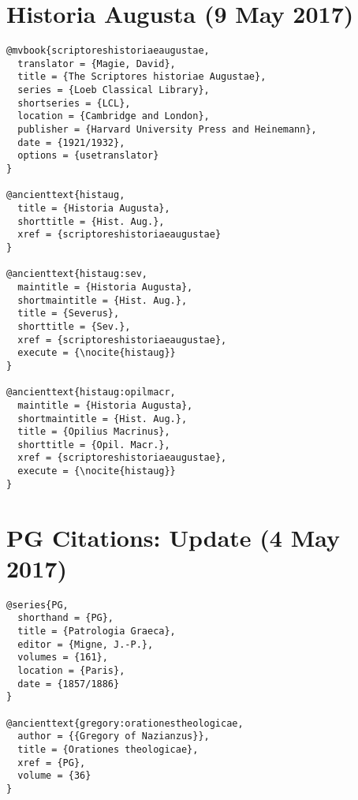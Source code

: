 \documentclass[a4paper]{article}
\begin{document}
\nocite{musoniusrufusfrag:abbrev}
\exampleancientsources
\examplesecondarysources
\examplebibliography
{}

\section{Historia Augusta (9 May 2017)}

\begin{verbatim}
@mvbook{scriptoreshistoriaeaugustae,
  translator = {Magie, David},
  title = {The Scriptores historiae Augustae},
  series = {Loeb Classical Library},
  shortseries = {LCL},
  location = {Cambridge and London},
  publisher = {Harvard University Press and Heinemann},
  date = {1921/1932},
  options = {usetranslator}
}

@ancienttext{histaug,
  title = {Historia Augusta},
  shorttitle = {Hist. Aug.},
  xref = {scriptoreshistoriaeaugustae}
}

@ancienttext{histaug:sev,
  maintitle = {Historia Augusta},
  shortmaintitle = {Hist. Aug.},
  title = {Severus},
  shorttitle = {Sev.},
  xref = {scriptoreshistoriaeaugustae},
  execute = {\nocite{histaug}}
}

@ancienttext{histaug:opilmacr,
  maintitle = {Historia Augusta},
  shortmaintitle = {Hist. Aug.},
  title = {Opilius Macrinus},
  shorttitle = {Opil. Macr.},
  xref = {scriptoreshistoriaeaugustae},
  execute = {\nocite{histaug}}
}
\end{verbatim}

\nocite{histaug}
\exampleancientsources
\examplesecondarysources
\examplebibliography
{}

\section{PG Citations: Update (4 May 2017)}

\begin{verbatim}
@series{PG,
  shorthand = {PG},
  title = {Patrologia Graeca},
  editor = {Migne, J.-P.},
  volumes = {161},
  location = {Paris},
  date = {1857/1886}
}

@ancienttext{gregory:orationestheologicae,
  author = {{Gregory of Nazianzus}},
  title = {Orationes theologicae},
  xref = {PG},
  volume = {36}
}
\end{verbatim}
\end{document}
